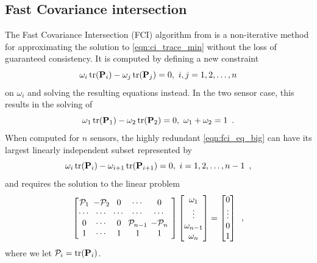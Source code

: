 \documentclass[letterpaper, 10 pt, conference]{ieeeconf}  %
\begin{document}
\subsection{Fast Covariance intersection}
The Fast Covariance Intersection (FCI) algorithm from \cite{niehsenInformationFusionBased2002} is a non-iterative method for approximating the solution to \eqref{eqn:ci_trace_min} without the loss of guaranteed consistency. It is computed by defining a new constraint
\begin{equation}
   \omega_i \operatorname{tr}({{\mathbf{P}}}_i) - \omega_j \operatorname{tr}({{\mathbf{P}}}_j) = 0,\ i,j=1,2,\dots,n \label{eqn:fci_eq_big}
\end{equation}
on $\omega_i$ and solving the resulting equations instead. In the two sensor case, this results in the solving of
\begin{equation}
   \omega_1 \operatorname{tr}({{\mathbf{P}}}_1) - \omega_2 \operatorname{tr}({{\mathbf{P}}}_2) = 0,\ \omega_1 + \omega_2 = 1\enspace. \label{eqn:fci_2sen_omega_sum_eq}
\end{equation}
When computed for $n$ sensors, the highly redundant \eqref{eqn:fci_eq_big} can have its largest linearly independent subset represented by
\begin{equation}
   \omega_i \operatorname{tr}({{\mathbf{P}}}_i) - \omega_{i+1} \operatorname{tr}({{\mathbf{P}}}_{i+1}) = 0,\ i=1,2,\dots,n-1\enspace, \label{eqn:fci_eq}
\end{equation}
and requires the solution to the linear problem
\begin{equation}
   \begingroup
   \setlength\arraycolsep{2pt}
   \begin{bmatrix}
      \mathcal{P}_1 & -\mathcal{P}_2 & 0 & \cdots & 0 \\
      \cdots & \cdots & \cdots & \cdots & \cdots & \\
      0 & \cdots & 0 & \mathcal{P}_{n-1} & -\mathcal{P}_{n} \\
      1 & \cdots & 1 & 1 & 1 &
   \end{bmatrix}
   \begin{bmatrix}
      \omega_1 \\
      \vdots \\
      \omega_{n-1} \\
      \omega_{n}
   \end{bmatrix}
   =
   \begin{bmatrix}
      0 \\
      \vdots \\
      0 \\
      1
   \end{bmatrix}\enspace, \label{eqn:fci_eq_sys}
   \endgroup
\end{equation}
where we let $\mathcal{P}_i = \operatorname{tr}({{\mathbf{P}}}_i)$.
\end{document}
